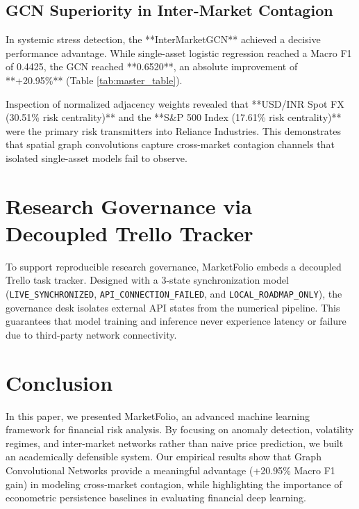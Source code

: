 \documentclass[10pt,twocolumn,letterpaper]{article}
\begin{document}
\subsection{GCN Superiority in Inter-Market Contagion}
In systemic stress detection, the **InterMarketGCN** achieved a decisive performance advantage. While single-asset logistic regression reached a Macro F1 of 0.4425, the GCN reached **0.6520**, an absolute improvement of **+20.95\%** (Table \ref{tab:master_table}).

Inspection of normalized adjacency weights revealed that **USD/INR Spot FX (30.51\% risk centrality)** and the **S\&P 500 Index (17.61\% risk centrality)** were the primary risk transmitters into Reliance Industries. This demonstrates that spatial graph convolutions capture cross-market contagion channels that isolated single-asset models fail to observe.

\section{Research Governance via Decoupled Trello Tracker}
To support reproducible research governance, MarketFolio embeds a decoupled Trello task tracker. Designed with a 3-state synchronization model (\texttt{LIVE\_SYNCHRONIZED}, \texttt{API\_CONNECTION\_FAILED}, and \texttt{LOCAL\_ROADMAP\_ONLY}), the governance desk isolates external API states from the numerical pipeline. This guarantees that model training and inference never experience latency or failure due to third-party network connectivity.

\section{Conclusion}
In this paper, we presented MarketFolio, an advanced machine learning framework for financial risk analysis. By focusing on anomaly detection, volatility regimes, and inter-market networks rather than naive price prediction, we built an academically defensible system. Our empirical results show that Graph Convolutional Networks provide a meaningful advantage (+20.95\% Macro F1 gain) in modeling cross-market contagion, while highlighting the importance of econometric persistence baselines in evaluating financial deep learning.
\end{document}
